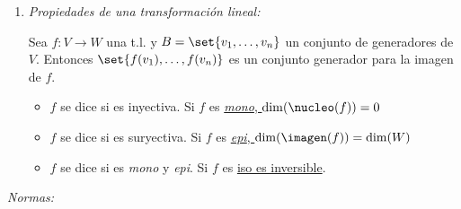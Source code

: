 \begin{enumerate}[label=\tiny\purple{\faIcon{snowman}}]
  \item \textit{Propiedades de una transformación lineal:}

        Sea $f: V \to W$ una t.l. y $B = \set{v_1, \ldots, v_n}$ un conjunto
        de generadores de $V$. Entonces $\set{f(v_1),\ldots, f(v_n) }$ es un conjunto
        generador para la imagen de $f$.

        \begin{itemize}
          \item $f$ se dice  si es inyectiva. Si $f$ es \ul{\textit{mono}, $\dim(\nucleo(f)) = 0$}
          \item $f$ se dice  si es suryectiva. Si $f$ es \ul{\textit{epi}, $\dim(\imagen(f)) = \dim(W)$}
          \item $f$ se dice  si es \textit{mono} y \textit{epi}. Si $f$ es \ul{iso es inversible}.
        \end{itemize}
\end{enumerate}

\bigskip

\hypertarget{teoria-2:normas}{\textit{Normas:}}

